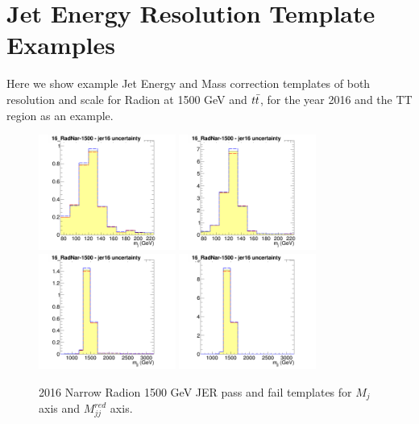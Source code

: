 \section{Jet Energy Resolution Template Examples\label{s:jerExamples}}
Here we show example Jet Energy and Mass correction templates of both resolution and scale for Radion at 1500 GeV and $t\bar{t} $, for the year 2016 and the TT region as an example. 
\begin{figure}[!htb]
	\centering
	\includegraphics[width=0.4\textwidth]{Figures/Uncertainty_16_RadNar-1500_jer16failX.png}
	\includegraphics[width=0.4\textwidth]{Figures/Uncertainty_16_RadNar-1500_jer16passX.png}
	\includegraphics[width=0.4\textwidth]{Figures/Uncertainty_16_RadNar-1500_jer16failY.png}
	\includegraphics[width=0.4\textwidth]{Figures/Uncertainty_16_RadNar-1500_jer16passY.png}
	\caption{2016 Narrow Radion 1500 GeV JER pass and fail templates for $M_j$ axis and $M_{jj}^{red}$ axis.}
	\label{fig:jerRadion1}
\end{figure}
